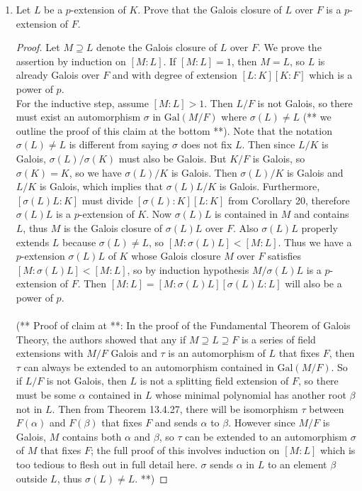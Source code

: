 \documentclass{article}
\begin{document}
  \begin{enumerate}[label={(\alph*)}]
    \item Let $L$ be a $p$-extension of $K$. Prove that the Galois closure
      of $L$ over $F$ is a $p$-extension of $F$.

      \begin{proof}
        Let $M\supseteq L$ denote the Galois closure of $L$ over $F$. We
        prove the assertion by induction on $[M:L]$. If $[M:L]=1$, then
        $M=L$, so $L$ is already Galois over $F$ and with degree of
        extension $[L:K][K:F]$ which is a power of $p$. \\

        For the inductive step, assume $[M:L]>1$. Then $L/F$ is not Galois,
        so there must exist an automorphism $\sigma$ in $\text{Gal}(M/F)$
        where $\sigma(L)\neq L$ (** we outline the proof of this claim at
        the bottom **). Note that the notation $\sigma(L)\neq L$ is
        different from saying $\sigma$ does not fix $L$. Then since $L/K$ is
        Galois, $\sigma(L)/\sigma(K)$ must also be Galois. But $K/F$ is
        Galois, so $\sigma(K)=K$, so we have $\sigma(L)/K$ is Galois. Then
        $\sigma(L)/K$ is Galois and $L/K$ is Galois, which implies that
        $\sigma(L)L/K$ is Galois.  Furthermore, $[\sigma(L)L:K]$ must
        divide $[\sigma(L):K][L:K]$ from Corollary 20, therefore
        $\sigma(L)L$ is a $p$-extension of $K$.  Now $\sigma(L)L$ is
        contained in $M$ and contains $L$, thus $M$ is the Galois closure
        of $\sigma(L)L$ over $F$. Also $\sigma(L)L$ properly extends $L$
        because $\sigma(L)\neq L$, so $[M:\sigma(L)L]<[M:L]$. Thus we have
        a $p$-extension $\sigma(L)L$ of $K$ whose Galois closure $M$ over
        $F$ satisfies $[M:\sigma(L)L]<[M:L]$, so by induction hypothesis
        $M/\sigma(L)L$ is a $p$-extension of $F$. Then $[M:L]
        =[M:\sigma(L)L][\sigma(L)L:L]$ will also be a power of $p$. \\\\

        (** Proof of claim at **: In the proof of the Fundamental Theorem
        of Galois Theory, the authors showed that any if $M\supseteq
        L\supseteq F$ is a series of field extensions with $M/F$ Galois and
        $\tau$ is an automorphism of $L$ that fixes $F$, then $\tau$ can
        always be extended to an automorphism contained in
        $\text{Gal}(M/F)$. So if $L/F$ is not Galois, then $L$ is not a
        splitting field extension of $F$, so there must be some $\alpha$
        contained in $L$ whose minimal polynomial has another root $\beta$
        not in $L$. Then from Theorem 13.4.27, there will be isomorphism
        $\tau$ between $F(\alpha)$ and $F(\beta)$ that fixes $F$ and sends
        $\alpha$ to $\beta$. However since $M/F$ is Galois, $M$ contains
        both $\alpha$ and $\beta$, so $\tau$ can be extended to an
        automorphism $\sigma$ of $M$ that fixes $F$; the full proof of this
        involves induction on $[M:L]$ which is too tedious to flesh out in
        full detail here. $\sigma$ sends $\alpha$ in $L$ to an element
        $\beta$ outside $L$, thus $\sigma(L)\neq L$. **)
      \end{proof}


\end{enumerate}
\end{document}

